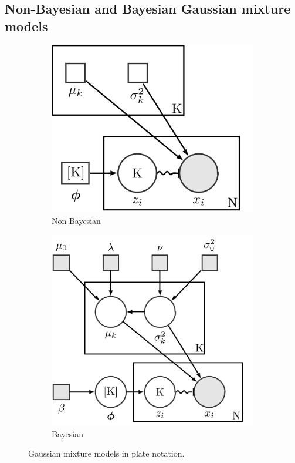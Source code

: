 \documentclass[conference]{IEEEtran}
\begin{document}
\subsection{Non-Bayesian and Bayesian Gaussian mixture models}

\begin{figure}[htbp]
    \centering
    \begin{subfigure}[b]{.4\linewidth}
        \centering
        \includegraphics[width=1\linewidth]{images/ComE/GMM.png}
        \caption{Non-Bayesian}
    \end{subfigure}%
    \begin{subfigure}[b]{.5\linewidth}
        \centering
        \includegraphics[width=1\linewidth]{images/ComE/BGMM.png}
        \caption{Bayesian}
    \end{subfigure}%
    \caption{Gaussian mixture models in plate notation\protect\footnotemark.}
    \label{fig:GMM_vs_BGMM_plates}
\end{figure}
\end{document}

